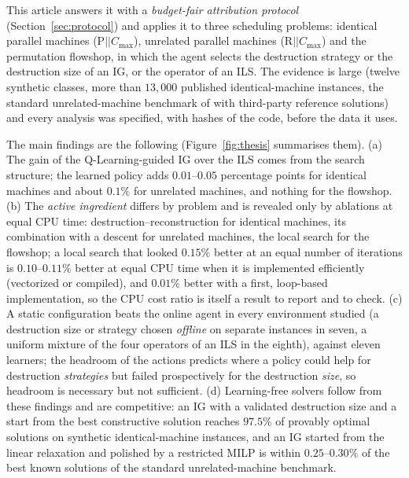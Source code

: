 This article answers it with a \emph{budget-fair attribution protocol} (Section~\ref{sec:protocol}) and applies it to three scheduling problems: identical parallel machines
(P$||C_{\max}$), unrelated parallel machines (R$||C_{\max}$) and the permutation flowshop, in which the agent selects the destruction strategy or the destruction size of an IG, or the
operator of an ILS. The evidence is large (twelve synthetic classes, more than $13{,}000$ published identical-machine instances, the standard unrelated-machine benchmark of
\citealt{FanjulPeyroRuiz2010} with third-party reference solutions) and every analysis was specified, with hashes of the code, before the data it uses.

The main findings are the following (Figure~\ref{fig:thesis} summarises them). (a) The gain of the Q-Learning-guided IG over the ILS comes from the search structure; the learned policy adds $0.01$--$0.05$ percentage points for
identical machines and about $0.1\%$ for unrelated machines, and nothing for the flowshop. (b) The \emph{active ingredient} differs by problem and is revealed only by ablations at equal CPU
time: destruction--reconstruction for identical machines, its combination with a descent for unrelated machines, the local search for the flowshop; a local search that looked $0.15\%$ better
at an equal number of iterations is $0.10$--$0.11\%$ better at equal CPU time when it is implemented efficiently (vectorized or compiled), and $0.01\%$ better with a first, loop-based implementation, so the CPU cost ratio is itself a result to report and to check. (c) A static configuration beats the online agent in every environment studied (a destruction size or strategy chosen \emph{offline} on separate instances in seven, a uniform mixture of the four operators of an ILS in the eighth),
against eleven learners; the headroom of the actions predicts where a policy could help for destruction \emph{strategies} but failed prospectively for the destruction \emph{size}, so headroom is
necessary but not sufficient. (d) Learning-free solvers follow from these findings and are competitive: an IG with a validated destruction size and a start from the best constructive solution
reaches $97.5\%$ of provably optimal solutions on synthetic identical-machine instances, and an IG started from the linear relaxation and polished by a restricted MILP is within $0.25$--$0.30\%$ of the
best known solutions of the standard unrelated-machine benchmark.

